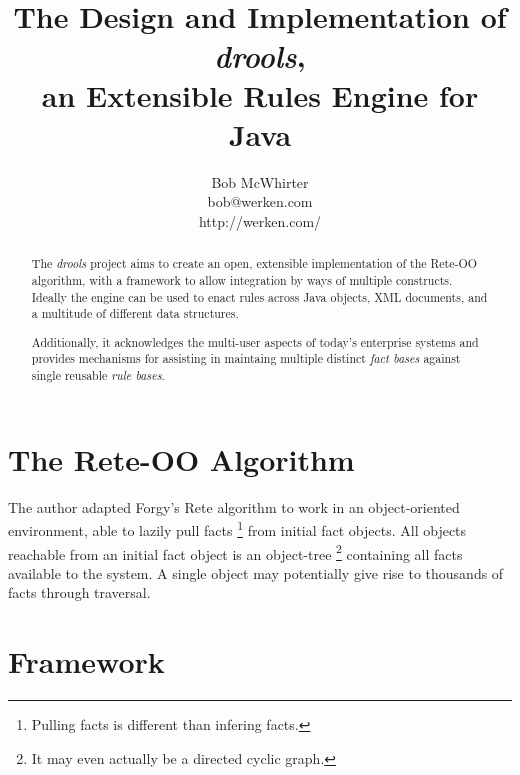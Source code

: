 \documentclass[10pt,twocolumn,letterpaper]{article}
\begin{document}
\let\footnoterule\hrule
\setlength{\skip\footins}{10pt plus 5pt minus 3pt}

\makeatletter

\renewcommand{\@makefntext}[1]%
	{\noindent\makebox[1.8em][r]{\@makefnmark}#1}

\makeatother

\title{The Design and Implementation of \emph{drools},\\an Extensible Rules
Engine for Java}

\author{Bob McWhirter\\bob@werken.com\\http://werken.com/}
\maketitle


\begin{abstract}
The \emph{drools} project aims to create an open, extensible
implementation of the Rete-OO algorithm, with a framework to
allow integration by ways of multiple constructs.  Ideally the 
engine can be used to enact rules across Java objects, XML
documents, and a multitude of different data structures.

Additionally, it acknowledges the multi-user aspects of today's
enterprise systems and provides mechanisms for assisting in
maintaing multiple distinct \emph{fact bases} against single 
reusable \emph{rule bases}.
\end{abstract}

\section{The Rete-OO Algorithm}

The author adapted Forgy's Rete algorithm\cite{forgy82rete} to work in an
object-oriented environment\cite{werken01reteoo}, able to lazily pull facts%
	\footnote{Pulling facts is different than infering facts.} 
from initial fact objects. All objects reachable from an
initial fact object is an object-tree%
	\footnote{It may even actually be a directed cyclic graph.}
containing all facts available to the system.  A single object
may potentially give rise to thousands of facts through traversal.

\section{Framework}
\end{document}
